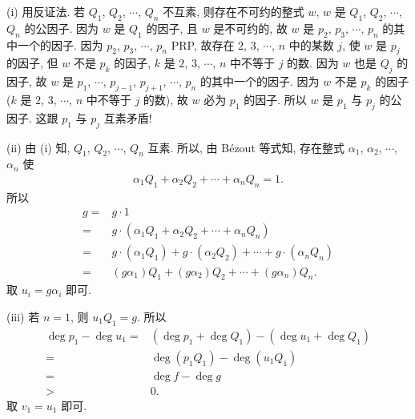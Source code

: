 \begin{pf}
    (i) 用反证法. 若 $Q_1$, $Q_2$, $\cdots$, $Q_n$ 不互素, 则存在不可约的整式 $w$, $w$ 是 $Q_1$, $Q_2$, $\cdots$, $Q_n$ 的公因子. 因为 $w$ 是 $Q_1$ 的因子, 且 $w$ 是不可约的, 故 $w$ 是 $p_2$, $p_3$, $\cdots$, $p_n$ 的其中一个的因子. 因为 $p_2$, $p_3$, $\cdots$, $p_n$ PRP, 故存在 $2$, $3$, $\cdots$, $n$ 中的某数 $j$, 使 $w$ 是 $p_j$ 的因子, 但 $w$ 不是 $p_k$ 的因子, $k$ 是 $2$, $3$, $\cdots$, $n$ 中不等于 $j$ 的数. 因为 $w$ 也是 $Q_j$ 的因子, 故 $w$ 是 $p_1$, $\cdots$, $p_{j-1}$, $p_{j+1}$, $\cdots$, $p_n$ 的其中一个的因子. 因为 $w$ 不是 $p_k$ 的因子 ($k$ 是 $2$, $3$, $\cdots$, $n$ 中不等于 $j$ 的数), 故 $w$ 必为 $p_1$ 的因子. 所以 $w$ 是 $p_1$ 与 $p_j$ 的公因子. 这跟 $p_1$ 与 $p_j$ 互素矛盾!

    (ii) 由 (i) 知, $Q_1$, $Q_2$, $\cdots$, $Q_n$ 互素. 所以, 由 Bézout 等式知, 存在整式 $\alpha_1$, $\alpha_2$, $\cdots$, $\alpha_n$ 使
    \begin{align*}
        \alpha_1 Q_1 + \alpha_2 Q_2 + \cdots + \alpha_n Q_n = 1.
    \end{align*}
    所以
    \begin{align*}
        g
        = {} & g \cdot 1                                                                         \\
        = {} & g \cdot (\alpha_1 Q_1 + \alpha_2 Q_2 + \cdots + \alpha_n Q_n)                     \\
        = {} & g \cdot (\alpha_1 Q_1) + g \cdot (\alpha_2 Q_2) + \cdots + g \cdot (\alpha_n Q_n) \\
        = {} & (g\alpha_1) Q_1 + (g\alpha_2) Q_2 + \cdots + (g\alpha_n) Q_n.
    \end{align*}
    取 $u_i = g\alpha_i$ 即可.

    (iii) 若 $n = 1$, 则 $u_1 Q_1 = g$. 所以
    \begin{align*}
        \deg p_1 - \deg u_1
        = {} & (\deg p_1 + \deg Q_1) - (\deg u_1 + \deg Q_1) \\
        = {} & \deg {(p_1 Q_1)} - \deg {(u_1 Q_1)}           \\
        = {} & \deg f - \deg g                               \\
        > {} & 0.
    \end{align*}
    取 $v_1 = u_1$ 即可.


\end{pf}
